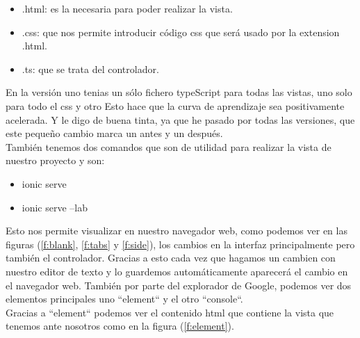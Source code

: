 \documentclass[a4paper, 11pt]{article}
\begin{document}
\begin{itemize}
            \begin{itemize}
                \item{.html: es la necesaria para poder realizar la vista.}
                \item{.css: que nos permite introducir código css que será usado por
                       la extension .html.}
                \item{.ts: que se trata del controlador.}
            \end{itemize}

            En la versión uno tenias un sólo fichero typeScript para todas las
            vistas, uno solo para todo el css y otro
            Esto hace que la curva de aprendizaje sea positivamente acelerada.
            Y le digo de buena tinta, ya que he pasado por todas las versiones,
            que este pequeño cambio marca un antes y un después.\\

            También tenemos dos comandos que son de utilidad para realizar la
            vista de nuestro proyecto y son:

            \begin{itemize}
                \item{ionic serve}
                \item{ionic serve --lab}
            \end{itemize}

            Esto nos permite visualizar en nuestro navegador web, como podemos
            ver en las figuras (\ref{f:blank}, \ref{f:tabs} y \ref{f:side}), los
            cambios en la interfaz principalmente pero también el controlador.
            Gracias a esto cada vez que hagamos un cambien con nuestro editor de
            texto y lo guardemos automáticamente aparecerá el cambio en el
            navegador web. También por parte del explorador de Google, podemos
            ver dos elementos principales uno ``element`` y el otro ``console``.\\

            Gracias a ``element`` podemos ver el contenido html que contiene la
            vista que tenemos ante nosotros como en la figura (\ref{f:element}).\\


\end{itemize}
\end{document}
